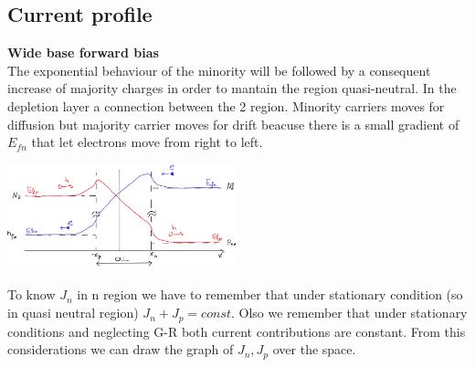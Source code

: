 \centering
{}
\raggedright

\centering
{}
\raggedright


\subsection{Current profile}
{\bf Wide base forward bias}\\
The exponential behaviour of the minority will be followed by a consequent increase of majority charges in order to mantain the region quasi-neutral. In the depletion layer a connection between the 2 region. Minority carriers moves for diffusion but majority carrier moves for drift beacuse there is a small gradient of $E_{fn}$ that let electrons move from right to left.

\centering
\includegraphics[width=0.5\textwidth]{nxfvb.png}\\
\raggedright

To know $J_n$ in n region we have to remember that under stationary condition (so in quasi neutral region) $J_n+J_p=const$. Olso we remember that under stationary conditions and neglecting G-R both current contributions are constant. From this considerations we can draw the graph of $J_n,J_p$ over the space.\\

